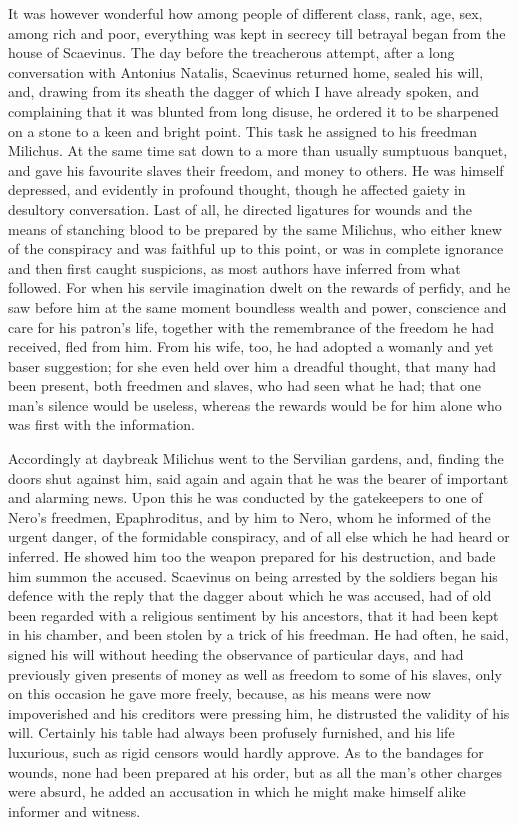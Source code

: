 
It was however wonderful how among people of different class, rank, age, sex, among rich and poor, everything was kept in secrecy till betrayal began from the house of Scaevinus. The day before the treacherous attempt, after a long conversation with Antonius Natalis, Scaevinus returned home, sealed his will, and, drawing from its sheath the dagger of which I have already spoken, and complaining that it was blunted from long disuse, he ordered it to be sharpened on a stone to a keen and bright point. This task he assigned to his freedman Milichus. At the same time sat down to a more than usually sumptuous banquet, and gave his favourite slaves their freedom, and money to others. He was himself depressed, and evidently in profound thought, though he affected gaiety in desultory conversation. Last of all, he directed ligatures for wounds and the means of stanching blood to be prepared by the same Milichus, who either knew of the conspiracy and was faithful up to this point, or was in complete ignorance and then first caught suspicions, as most authors have inferred from what followed. For when his servile imagination dwelt on the rewards of perfidy, and he saw before him at the same moment boundless wealth and power, conscience and care for his patron's life, together with the remembrance of the freedom he had received, fled from him. From his wife, too, he had adopted a womanly and yet baser suggestion; for she even held over him a dreadful thought, that many had been present, both freedmen and slaves, who had seen what he had; that one man's silence would be useless, whereas the rewards would be for him alone who was first with the information.


Accordingly at daybreak Milichus went to the Servilian gardens, and, finding the doors shut against him, said again and again that he was the bearer of important and alarming news. Upon this he was conducted by the gatekeepers to one of Nero's freedmen, Epaphroditus, and by him to Nero, whom he informed of the urgent danger, of the formidable conspiracy, and of all else which he had heard or inferred. He showed him too the weapon prepared for his destruction, and bade him summon the accused. Scaevinus on being arrested by the soldiers began his defence with the reply that the dagger about which he was accused, had of old been regarded with a religious sentiment by his ancestors, that it had been kept in his chamber, and been stolen by a trick of his freedman. He had often, he said, signed his will without heeding the observance of particular days, and had previously given presents of money as well as freedom to some of his slaves, only on this occasion he gave more freely, because, as his means were now impoverished and his creditors were pressing him, he distrusted the validity of his will. Certainly his table had always been profusely furnished, and his life luxurious, such as rigid censors would hardly approve. As to the bandages for wounds, none had been prepared at his order, but as all the man's other charges were absurd, he added an accusation in which he might make himself alike informer and witness.

